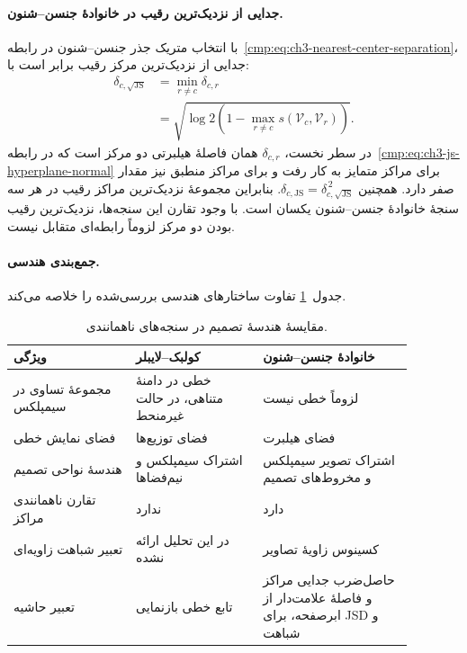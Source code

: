\paragraph{جدایی از نزدیک‌ترین رقیب در خانوادهٔ جنسن--شنون.}
با انتخاب متریک جذر جنسن--شنون در
رابطه~\eqref{cmp:eq:ch3-nearest-center-separation}،
جدایی از نزدیک‌ترین مرکز رقیب برابر است با:
\begin{equation}\label{cmp:eq:ch3-js-nearest-center-angular}
\begin{aligned}
\delta_{c,\sqrt{\mathrm{JS}}}
&=\min_{r\ne c}\delta_{c,r}\\
&=\sqrt{\log2\left(1-\max_{r\ne c}
s(\mathcal V_c,\mathcal V_r)\right)}.
\end{aligned}
\end{equation}
در سطر نخست، $\delta_{c,r}$ همان فاصلهٔ
هیلبرتی دو مرکز است که در
رابطه~\eqref{cmp:eq:ch3-js-hyperplane-normal}
برای مراکز متمایز به کار رفت و برای
مراکز منطبق نیز مقدار صفر دارد.
همچنین
$\delta_{c,\mathrm{JS}}=\delta_{c,\sqrt{\mathrm{JS}}}^{\,2}$.
بنابراین مجموعهٔ نزدیک‌ترین مراکز رقیب
در هر سه سنجهٔ خانوادهٔ جنسن--شنون یکسان است.
با وجود تقارن این سنجه‌ها، نزدیک‌ترین رقیب
بودن دو مرکز لزوماً رابطه‌ای متقابل نیست.

\paragraph{جمع‌بندی هندسی.}
جدول~\ref{cmp:tab:ch3-decision-geometry-comparison}
تفاوت ساختارهای هندسی بررسی‌شده را خلاصه
می‌کند.

\begin{table}[!htbp]
\centering
\caption{مقایسهٔ هندسهٔ تصمیم در سنجه‌های ناهمانندی.}
\label{cmp:tab:ch3-decision-geometry-comparison}
\begin{tabular}{p{0.27\linewidth}p{0.28\linewidth}p{0.33\linewidth}}
\hline
ویژگی & کولبک--لایبلر & خانوادهٔ جنسن--شنون\\
\hline
مجموعهٔ تساوی در سیمپلکس
& خطی در دامنهٔ متناهی، در حالت غیرمنحط
& لزوماً خطی نیست\\
فضای نمایش خطی & فضای توزیع‌ها & فضای هیلبرت\\
هندسهٔ نواحی تصمیم
& اشتراک سیمپلکس و نیم‌فضاها
& اشتراک تصویر سیمپلکس و مخروط‌های تصمیم\\
تقارن ناهمانندی مراکز & ندارد & دارد\\
تعبیر شباهت زاویه‌ای & در این تحلیل ارائه نشده & کسینوس زاویهٔ تصاویر\\
تعبیر حاشیه
& تابع خطی بازنمایی
& حاصل‌ضرب جدایی مراکز و فاصلهٔ علامت‌دار از ابرصفحه، برای JSD و شباهت\\
\hline
\end{tabular}
\end{table}

